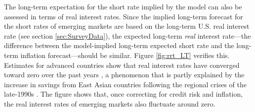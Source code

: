 {%


The long-term expectation for the short rate implied by the model can also be assessed in terms of real interest rates.
Since the implied long-term forecast for the short rates of emerging markets are based on the long-term U.S. real interest rate (see section \ref{sec:SurveyData}), the expected long-term \textit{real} interest rate---the difference between the model-implied long-term expected short rate and the long-term inflation forecast---should be similar.
Figure \ref{fig:rrt_LT} verifies this.
Estimates for advanced countries show that real interest rates have converged toward zero over the past years \citep*{HolstonLaubachWilliams:2017}, a phenomenon that is partly explained by the increase in savings from East Asian countries following the regional crises of the late-1990s \citep{Obstfeld:2020}.
The figure shows that, once correcting for credit risk and inflation, the real interest rates of emerging markets also fluctuate around zero.

}
